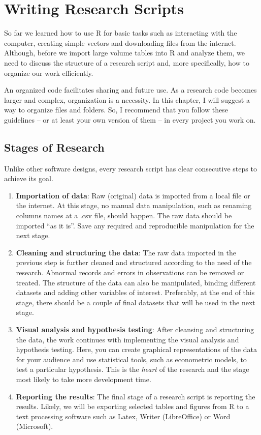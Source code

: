 \documentclass[
  12pt,
]{book}
\begin{document}
\hypertarget{research-scripts}{%
\chapter{Writing Research Scripts}\label{research-scripts}}

So far we learned how to use R for basic tasks such as interacting with the computer, creating simple vectors and downloading files from the internet. Although, before we import large volume tables into R and analyze them, we need to discuss the structure of a research script and, more specifically, how to organize our work efficiently. 

An organized code facilitates sharing and future use. As a research code becomes larger and complex, organization is a necessity. In this chapter, I will suggest a way to organize files and folders. So, I recommend that you follow these guidelines -- or at least your own version of them -- in every project you work on.

\hypertarget{stages-of-research}{%
\section{Stages of Research}\label{stages-of-research}}

Unlike other software designs, every research script has clear consecutive steps to achieve its goal.

\begin{enumerate}
\def\labelenumi{\arabic{enumi}.}
\item
  \textbf{Importation of data}: Raw (original) data is imported from a local file or the internet. At this stage, no manual data manipulation, such as renaming columns names at a .csv file, should happen. The raw data should be imported ``as it is''. Save any required and reproducible manipulation for the next stage.
\item
  \textbf{Cleaning and structuring the data}: The raw data imported in the previous step is further cleaned and structured according to the need of the research. Abnormal records and errors in observations can be removed or treated. The structure of the data can also be manipulated, binding different datasets and adding other variables of interest. Preferably, at the end of this stage, there should be a couple of final datasets that will be used in the next stage.
\item
  \textbf{Visual analysis and hypothesis testing}: After cleansing and structuring the data, the work continues with implementing the visual analysis and hypothesis testing. Here, you can create graphical representations of the data for your audience and use statistical tools, such as econometric models, to test a particular hypothesis. This is the \emph{heart} of the research and the stage most likely to take more development time.
\item
  \textbf{Reporting the results}: The final stage of a research script is reporting the results. Likely, we will be exporting selected tables and figures from R to a text processing software such as Latex, Writer (LibreOffice) or Word (Microsoft).
\end{enumerate}
\end{document}
